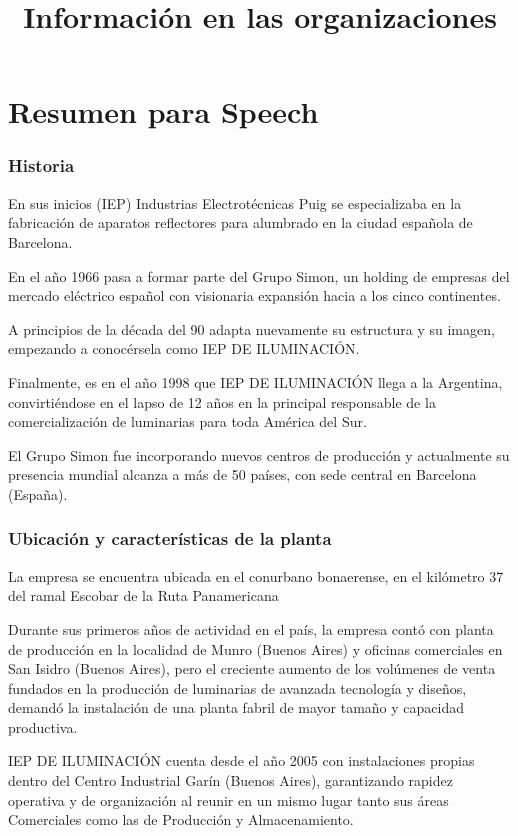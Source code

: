 \documentclass[12pt,titlepage]{report}
\begin{document}

\title{Información en las organizaciones}
\author{}

\part{Resumen para Speech}
\section{Historia}

En sus inicios (IEP) Industrias Electrot\'ecnicas Puig  se especializaba en la fabricaci\'on de aparatos reflectores para alumbrado en la ciudad española de Barcelona.

En el año 1966 pasa a formar parte del Grupo Simon, un holding de empresas del mercado el\'ectrico español con visionaria expansi\'on hacia a los cinco continentes.

A principios de la d\'ecada del 90 adapta nuevamente su estructura y su imagen, empezando a conoc\'ersela como IEP DE ILUMINACI\'ON.

Finalmente, es en el año 1998 que IEP DE ILUMINACI\'ON llega a la Argentina, convirti\'endose en el lapso de 12 años en la principal responsable de la comercializaci\'on de luminarias para toda Am\'erica del Sur.

El Grupo Simon fue incorporando nuevos centros de producci\'on y actualmente su presencia mundial alcanza a m\'as de 50 pa\'ises, con sede central en Barcelona (España).


\section{Ubicaci\'on y caracter\'isticas de la planta}
La empresa se encuentra ubicada en el conurbano bonaerense, en el kil\'ometro 37 del ramal Escobar de la Ruta Panamericana

Durante sus primeros años de actividad en el pa\'is, la empresa cont\'o con planta de producci\'on en la localidad de Munro (Buenos Aires) y oficinas comerciales en San Isidro (Buenos Aires), pero el creciente aumento de los vol\'umenes de venta fundados en la producci\'on de luminarias de avanzada tecnolog\'ia y diseños, demand\'o la instalaci\'on de una planta fabril de mayor tamaño y capacidad productiva.

IEP DE ILUMINACI\'ON cuenta desde el año 2005 con instalaciones propias dentro del Centro Industrial Gar\'in (Buenos Aires), garantizando rapidez operativa y de organizaci\'on al reunir en un mismo lugar tanto sus \'areas Comerciales como las de Producci\'on y Almacenamiento.
\end{document}
